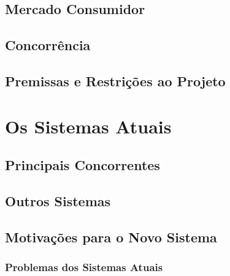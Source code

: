 \documentclass[a4paper]{abntex2}
\begin{document}
\section{Mercado Consumidor}

\section{Concorrência}

\section{Premissas e Restrições ao Projeto}

\chapter{Os Sistemas Atuais}

\section{Principais Concorrentes}


\section{Outros Sistemas}

\section{Motivações para o Novo Sistema}

\subsection{Problemas dos Sistemas Atuais}

\end{document}
